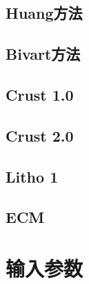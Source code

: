 		\section{Huang方法}
		\label{Geology: Huang Method}
		\section{Bivart方法}
		\label{Geology: Bivart Method}
		\section{Crust 1.0}
		\section{Crust 2.0}
		\section{Litho 1}
		\section{ECM}
		
	\chapter{输入参数}
